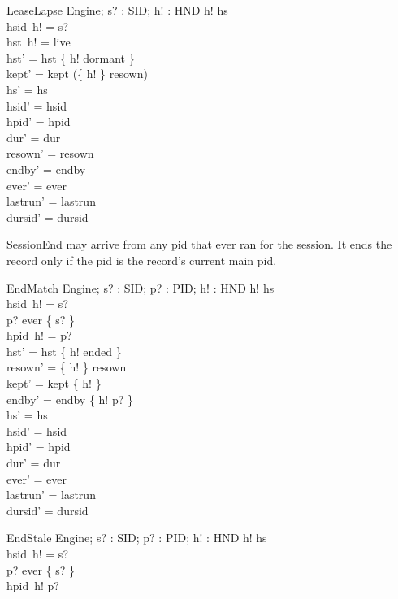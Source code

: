 \documentclass[a4paper,10pt,fleqn]{article}
\begin{document}
\begin{schema}{LeaseLapse}
  \Delta Engine; s? : SID; h! : HND
\where
  h! \in hs \\
  hsid~h! = s? \\
  hst~h! = live \\
  hst' = hst \oplus \{ h! \mapsto dormant \} \\
  kept' = kept \cup (\{ h! \} \cap \dom resown) \\
  hs' = hs \\
  hsid' = hsid \\
  hpid' = hpid \\
  dur' = dur \\
  resown' = resown \\
  endby' = endby \\
  ever' = ever \\
  lastrun' = lastrun \\
  dursid' = dursid
\end{schema}

SessionEnd may arrive from any pid that ever ran for the session.  It ends
the record only if the pid is the record's current main pid.

\begin{schema}{EndMatch}
  \Delta Engine; s? : SID; p? : PID; h! : HND
\where
  h! \in hs \\
  hsid~h! = s? \\
  p? \in ever \limg \{ s? \} \rimg \\
  hpid~h! = p? \\
  hst' = hst \oplus \{ h! \mapsto ended \} \\
  resown' = \{ h! \} \ndres resown \\
  kept' = kept \setminus \{ h! \} \\
  endby' = endby \oplus \{ h! \mapsto p? \} \\
  hs' = hs \\
  hsid' = hsid \\
  hpid' = hpid \\
  dur' = dur \\
  ever' = ever \\
  lastrun' = lastrun \\
  dursid' = dursid
\end{schema}

\begin{schema}{EndStale}
  \Xi Engine; s? : SID; p? : PID; h! : HND
\where
  h! \in hs \\
  hsid~h! = s? \\
  p? \in ever \limg \{ s? \} \rimg \\
  hpid~h! \neq p?
\end{schema}
\end{document}
